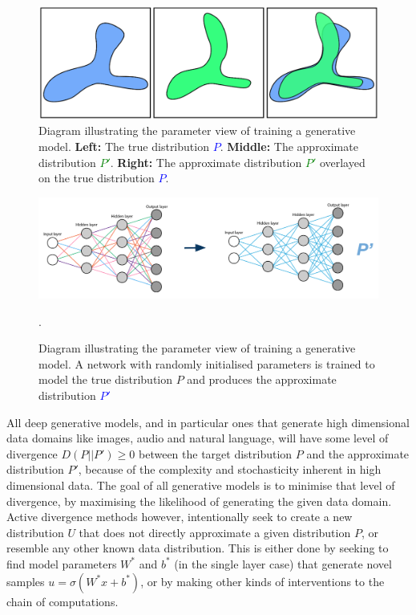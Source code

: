 \begin{figure}[!htbp]
    \centering
    \includegraphics[width=1\textwidth]{figures/c2_background/diagrams/training_gen_model_distro_view.png}
    \caption[Diagram illustrating the distribution view of training a generative model.]{Diagram illustrating the parameter view of training a generative model. \textbf{Left:} The true distribution \textcolor{blue}{$P$}. \textbf{Middle:} The approximate distribution \textcolor{green}{$P'$}. \textbf{Right:} The approximate distribution \textcolor{green}{$P'$} overlayed on the true distribution \textcolor{blue}{$P$}.}
  \label{fig:c6:gen-model-distribution-view}
  \end{figure}

\begin{figure}[!htbp]
    \centering
    \includegraphics[width=1\textwidth]{figures/c2_background/diagrams/training_generative_model_parameter_view.png}
    \caption[Diagram illustrating the parameter view of training a generative model.]{Diagram illustrating the parameter view of training a generative model. A network with randomly initialised parameters is trained to model the true distribution $P$ and produces the approximate distribution \textcolor{blue}{$P'$}}.
  \label{fig:c6:gen-model-parameter-view}
  \end{figure}

All deep generative models, and in particular ones that generate high dimensional data domains like images, audio and natural language, will have some level of divergence $D(P||P') \geq 0$ between the target distribution $P$ and the approximate distribution $P'$, because of the complexity and stochasticity inherent in high dimensional data. 
The goal of all generative models is to minimise that level of divergence, by maximising the likelihood of generating the given data domain. 
Active divergence methods however, intentionally seek to create a new distribution $U$ that does not directly approximate a given distribution $P$, or resemble any other known data distribution. 
This is either done by seeking to find model parameters $W^*$ and $b^*$ (in the single layer case) that generate novel samples $u = \sigma(W^*x+b^*)$, or by making other kinds of interventions to the chain of computations.

